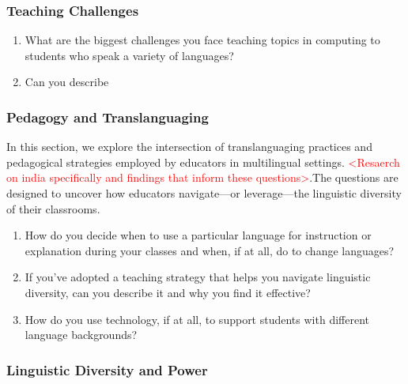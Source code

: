 {\subsubsection{Teaching Challenges}\label{subsubsec:teaching-challenges}

\begin{enumerate}[label={TC.\arabic*}, align=left, leftmargin=4em]
  \item What are the biggest challenges you face teaching topics in
    computing to students who speak a variety of languages?
  \item Can you describe 
\end{enumerate}

\subsubsection{Pedagogy and Translanguaging}\label{subsubsec:pedagogy-and-translanguaging}

In this section, we explore the intersection of translanguaging practices and
pedagogical strategies employed by educators in multilingual settings.
\textcolor{red}{<Resaerch on india specifically and findings that inform these
questions>}.The questions are designed to uncover how educators navigate---or
leverage---the linguistic diversity of their classrooms.
\begin{enumerate}[label={PT.\arabic*}, align=left, leftmargin=4em]
  \item How do you decide when to use a particular language for
    instruction or explanation during your classes and when, if at all, do
    to change languages?
  \item If you've adopted a teaching strategy that helps you navigate
    linguistic diversity, can you describe it and why you find it effective?
  \item How do you use technology, if at all, to support students with
    different language backgrounds?
\end{enumerate}

\subsubsection{Linguistic Diversity and Power}\label{subsubsec:linguistic-diversity-and-power}

}
